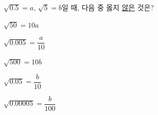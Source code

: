 $\sqrt{0.5}=a$, $\sqrt{5}=b$일 때, 다음 중 옳지 \underline{않은} 것은?
\begin{choices32}{\rule[-3ex]{0pt}{8ex}$\sqrt{50}=10a$}{\rule[-3ex]{0pt}{8ex}$\sqrt{0.005}=\dfrac{a}{10}$}{\rule[-3ex]{0pt}{8ex}$\sqrt{500}=10b$}{\rule[-3ex]{0pt}{8ex}$\sqrt{0.05}=\dfrac{b}{10}$}{\rule[-3ex]{0pt}{8ex}$\sqrt{0.00005}=\dfrac{b}{100}$}\end{choices32}
